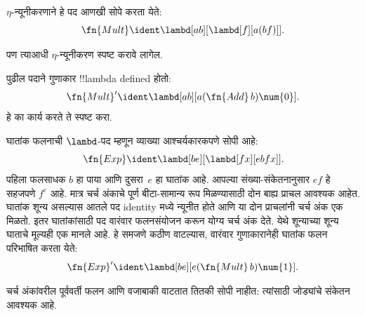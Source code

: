 \documentclass[../../../include/open-logic-section]{subfiles}
\begin{document}
\begin{editorial}
$\eta$-न्यूनीकरणाने हे पद आणखी सोपे करता येते:
\[
  \fn{Mult} \ident \lambd[ab][\lambd[f][a (b f)]].
\]

पण त्याआधी $\eta$-न्यूनीकरण स्पष्ट करावे लागेल.
\end{editorial}

\begin{prob}
पुढील पदाने गुणाकार !!{lambda define}d होतो:
\[
  \fn{Mult}' \ident \lambd[ab][a (\fn{Add}\, b) \num{0}].
\]
हे का कार्य करते ते स्पष्ट करा.
\end{prob}

घातांक फलनाची $\lambd$-पद म्हणून व्याख्या
आश्चर्यकारकपणे सोपी आहे:
\[
  \fn{Exp} \ident \lambd[be][\lambd[fx][e b f x]].
\]
पहिला फलसाधक $b$ हा पाया आणि दुसरा~$e$ हा
घातांक आहे. आपल्या संख्या-संकेतनानुसार $e f$
हे सहजपणे $f^e$ आहे. मात्र चर्च अंकाचे पूर्ण
बीटा-सामान्य रूप मिळण्यासाठी दोन बाह्य प्राचल आवश्यक
आहेत. घातांक शून्य असल्यास आतले पद identity मध्ये
न्यूनीत होते आणि या दोन प्राचलांनी चर्च अंक एक मिळतो.
इतर घातांकांसाठी पद वारंवार फलनसंयोजन करून योग्य
चर्च अंक देते. येथे शून्याच्या शून्य घाताचे मूल्यही एक
मानले आहे. हे समजणे कठीण वाटल्यास,
वारंवार गुणाकारानेही घातांक फलन परिभाषित करता येते:
\[
  \fn{Exp}' \ident \lambd[be][e (\fn{Mult}\, b) \num{1}].
\]

चर्च अंकांवरील पूर्ववर्ती फलन आणि वजाबाकी वाटतात
तितकी सोपी नाहीत: त्यांसाठी जोड्यांचे संकेतन आवश्यक आहे.
\end{document}
